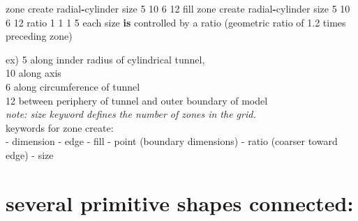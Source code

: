 \documentclass[a4paper, nobind]{templates/ociamthesis}
\newenvironment{Shaded}{\begin{snugshade}}{\end{snugshade}}
\newcommand{\DecValTok}[1]{\textcolor[rgb]{0.00,0.00,0.81}{#1}}
\newcommand{\FloatTok}[1]{\textcolor[rgb]{0.00,0.00,0.81}{#1}}
\newcommand{\KeywordTok}[1]{\textcolor[rgb]{0.13,0.29,0.53}{\textbf{#1}}}
\newcommand{\NormalTok}[1]{#1}
\newcommand{\OperatorTok}[1]{\textcolor[rgb]{0.81,0.36,0.00}{\textbf{#1}}}
\renewenvironment{Shaded}
{
  \vspace{10pt}%
  \begin{snugshade}%
}{%
  \end{snugshade}%
  \vspace{8pt}%
}
\begin{document}
\begin{Shaded}
\begin{Highlighting}[]
\NormalTok{zone create radial}\OperatorTok{{-}}\NormalTok{cylinder size }\DecValTok{5} \DecValTok{10} \DecValTok{6} \DecValTok{12}\NormalTok{ fill}
\NormalTok{zone create radial}\OperatorTok{{-}}\NormalTok{cylinder size }\DecValTok{5} \DecValTok{10} \DecValTok{6} \DecValTok{12}\NormalTok{ ratio }\DecValTok{1} \DecValTok{1} \DecValTok{1} \DecValTok{5}
\NormalTok{each size }\KeywordTok{is}\NormalTok{ controlled by a ratio (geometric ratio of }\FloatTok{1.2}\NormalTok{ times preceding zone)}
\end{Highlighting}
\end{Shaded}

ex) 5 along innder radius of cylindrical tunnel,\\
10 along axis\\
6 along circumference of tunnel\\
12 between periphery of tunnel and outer boundary of model\\
\emph{note: size keyword defines the number of zones in the grid.}\\

keywords for zone create:\\
- dimension
- edge
- fill
- point (boundary dimensions)
- ratio (coarser toward edge)
- size

\hypertarget{several-primitive-shapes-connected}{%
\section{several primitive shapes connected:}\label{several-primitive-shapes-connected}}
\end{document}
